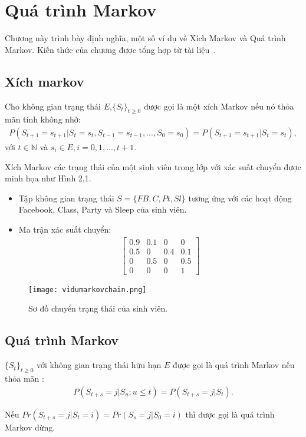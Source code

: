 \chapter{Quá trình Markov}
\label{ch:02}
	Chương này trình bày định nghĩa, một số ví dụ về Xích Markov và Quá trình Markov. Kiến thức của chương được tổng hợp từ tài liệu~\cite{Gagniuc2017}.
\section{Xích markov}
\begin{dn} \rm
Cho không gian trạng thái $E$,$\lbrace S_{t}\rbrace _{t\geq 0}$ được gọi là một xích Markov nếu nó thỏa mãn tính không nhớ:
\begin{align}
P(S_{t+1}=s_{t+1}|S_{t}=s_{t},S_{t-1}=s_{t-1},...,S_{0}=s_{0}) = P(S_{t+1}=s_{t+1}|S_{t}=s_{t}),
\end{align}
với $t\in \mathbb{N}$ và $s_{i} \in E, i = 0,1,...,t+1.$
\end{dn}

\begin{vd}
Xích Markov các trạng thái của một sinh viên trong lớp với xác suất chuyển được minh họa như Hình 2.1. 
\begin{itemize}
\item Tập không gian trạng thái $S = \lbrace FB,C,Pt,Sl \rbrace $ tương ứng với các hoạt động Facebook, Class, Party và Sleep của sinh viên.
\item Ma trận xác suất chuyển:
\begin{align*}
\begin{bmatrix}
0.9&  0.1&  0& 0\\ 
0.5&  0&  0.4& 0.1\\ 
0&  0.5& 0 & 0.5\\ 
0 & 0 & 0 & 1
\end{bmatrix}
\end{align*}
\end{itemize}
\newpage
\begin{figure}[ht] {\label{h2.1}}
    \centering
    \texttt{[image: vidumarkovchain.png]}
    \caption{Sơ đồ chuyển trạng thái của sinh viên.}
    \label{fig:tactumoitruong}
\end{figure}
\end{vd}
\section{Quá trình Markov}
\begin{dn} \rm
$\lbrace S_{t}\rbrace _{t\geq 0}$ với không gian trạng thái hữu hạn $E$ được gọi là quá trình Markov nếu thỏa mãn :
\begin{align}
P(S_{t+s}=j|S_{u};u\leq t)=P(S_{t+s}=j|S_{t}).
\end{align}
\end{dn}
\begin{nx} \rm
Nếu $Pr(S_{t+s}=j|S_{t}=i)=Pr(S_{s}=j|S_{0}=i)$ thì được gọi là quá trình Markov dừng.
\end{nx}